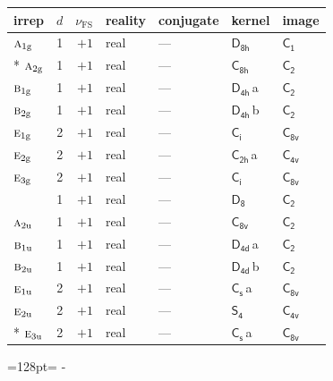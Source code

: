 \documentclass[10pt,a4paper]{article}
\newcommand{\needspace}[1]{\par\penalty-100\begingroup\dimen0=#1\relax\dimen2=\pagegoal
  \advance\dimen2-\pagetotal\ifdim\dimen0>\dimen2\relax\ifdim\dimen2>0pt\vfil\break\fi\fi
  \endgroup}
\numberwithin{equation}{section}
\newcommand{\grp}[1]{\mathsf{#1}}
\newcommand{\irr}[1]{\text{\normalfont\scshape #1}}
\newcommand{\detbox}[1]{{\setlength{\fboxsep}{1pt}\fbox{#1}}}
\newcommand{\ptag}[1]{\mathrm{#1}}
\newcommand{\clsletter}[1]{\,{\scriptsize\color{black!55}#1}}
\newcommand{\fsind}{\nu_{\mathrm{FS}}}
\begin{document}
{\small\renewcommand{\arraystretch}{1.25}\begin{longtable}{@{}lrrllll@{}}\toprule
irrep & $d$ & $\fsind$ & reality & conjugate & kernel & image\\\midrule\endhead
\bottomrule\endfoot\endlastfoot
$\irr{a}_{1\ptag{g}}$ & 1 & $+1$ & real & --- & \href{D8h.pdf}{$\grp{D_{8h}}$} & \href{C1.pdf}{$\grp{C_{1}}$}\\*
$\irr{a}_{2\ptag{g}}$ & 1 & $+1$ & real & --- & \href{C8h.pdf}{$\grp{C_{8h}}$} & \href{C2.pdf}{$\grp{C_{2}}$}\\
$\irr{b}_{1\ptag{g}}$ & 1 & $+1$ & real & --- & \href{D4h.pdf}{$\grp{D_{4h}}$}\clsletter{a} & \href{C2.pdf}{$\grp{C_{2}}$}\\
$\irr{b}_{2\ptag{g}}$ & 1 & $+1$ & real & --- & \href{D4h.pdf}{$\grp{D_{4h}}$}\clsletter{b} & \href{C2.pdf}{$\grp{C_{2}}$}\\
$\irr{e}_{1\ptag{g}}$ & 2 & $+1$ & real & --- & \href{S2.pdf}{$\grp{C_{i}}$} & \href{C8v.pdf}{$\grp{C_{8v}}$}\\
$\irr{e}_{2\ptag{g}}$ & 2 & $+1$ & real & --- & \href{C2h.pdf}{$\grp{C_{2h}}$}\clsletter{a} & \href{C4v.pdf}{$\grp{C_{4v}}$}\\
$\irr{e}_{3\ptag{g}}$ & 2 & $+1$ & real & --- & \href{S2.pdf}{$\grp{C_{i}}$} & \href{C8v.pdf}{$\grp{C_{8v}}$}\\
\detbox{$\irr{a}_{1\ptag{u}}$} & 1 & $+1$ & real & --- & \href{D8.pdf}{$\grp{D_{8}}$} & \href{C2.pdf}{$\grp{C_{2}}$}\\
$\irr{a}_{2\ptag{u}}$ & 1 & $+1$ & real & --- & \href{C8v.pdf}{$\grp{C_{8v}}$} & \href{C2.pdf}{$\grp{C_{2}}$}\\
$\irr{b}_{1\ptag{u}}$ & 1 & $+1$ & real & --- & \href{D4d.pdf}{$\grp{D_{4d}}$}\clsletter{a} & \href{C2.pdf}{$\grp{C_{2}}$}\\
$\irr{b}_{2\ptag{u}}$ & 1 & $+1$ & real & --- & \href{D4d.pdf}{$\grp{D_{4d}}$}\clsletter{b} & \href{C2.pdf}{$\grp{C_{2}}$}\\
$\irr{e}_{1\ptag{u}}$ & 2 & $+1$ & real & --- & \href{C1v.pdf}{$\grp{C_{s}}$}\clsletter{a} & \href{C8v.pdf}{$\grp{C_{8v}}$}\\
$\irr{e}_{2\ptag{u}}$ & 2 & $+1$ & real & --- & \href{S4.pdf}{$\grp{S_{4}}$} & \href{C4v.pdf}{$\grp{C_{4v}}$}\\*
$\irr{e}_{3\ptag{u}}$ & 2 & $+1$ & real & --- & \href{C1v.pdf}{$\grp{C_{s}}$}\clsletter{a} & \href{C8v.pdf}{$\grp{C_{8v}}$}\\
\bottomrule\end{longtable}}
\needspace{128pt}
\end{document}
